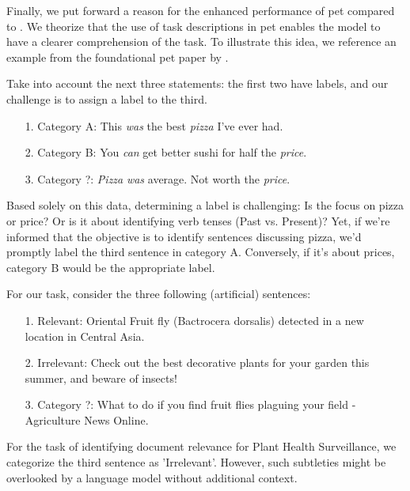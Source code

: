 


Finally, we put forward a reason for the enhanced performance of \gls{pet} compared to \finetuning{}. We theorize that the use of task descriptions in \gls{pet} enables the model to have a clearer comprehension of the task. To illustrate this idea, we reference an example from the foundational \gls{pet} paper by .

Take into account the next three statements: the first two have labels, and our challenge is to assign a label to the third.


\begin{itemize}
    \item[1.] Category A: This \textit{was} the best \textit{pizza} I've ever had.
    \item[2.] Category B: You \textit{can} get better sushi for half the \textit{price}.
    \item[3.] Category ?: \textit{Pizza} \textit{was} average. Not worth the \textit{price}.
\end{itemize}
\vspace{4pt}

Based solely on this data, determining a label is challenging: Is the focus on pizza or price? Or is it about identifying verb tenses (Past vs. Present)? Yet, if we're informed that the objective is to identify sentences discussing pizza, we'd promptly label the third sentence in category A. Conversely, if it's about prices, category B would be the appropriate label. 

For our task, consider the three following (artificial) sentences:
\begin{itemize}
    \item[1.] Relevant: Oriental Fruit fly (Bactrocera dorsalis) detected in a new location in Central Asia.
    \item[2.] Irrelevant: Check out the best decorative plants for your garden this summer, and beware of insects! 
    \item[3.] Category ?: What to do if you find fruit flies plaguing your field - Agriculture News Online. 
\end{itemize}
\vspace{4pt}

For the task of identifying document relevance for Plant Health Surveillance, we categorize the third sentence as 'Irrelevant'. However, such subtleties might be overlooked by a language model without additional context.


